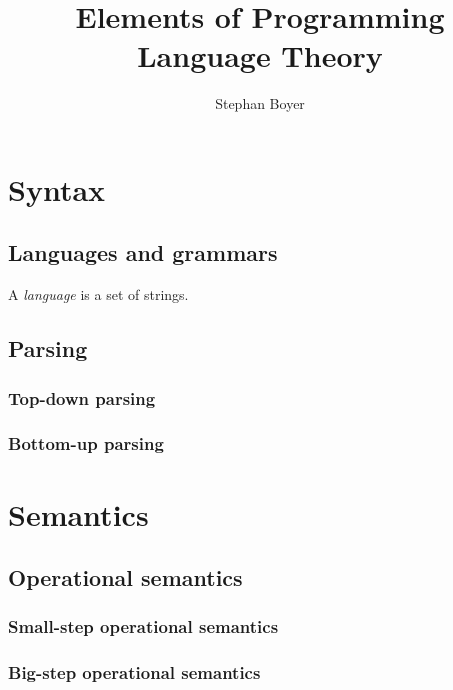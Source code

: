 \documentclass[oneside]{book}
\title{Elements of Programming Language Theory}
\author{Stephan Boyer}
\date{}
\begin{document}
  

  \frontmatter

  \maketitle

  

  \tableofcontents

  \mainmatter

  \part{Syntax}

    \chapter{Languages and grammars}

      A \emph{language} is a set of strings.

    \chapter{Parsing}

      \section{Top-down parsing}

      \section{Bottom-up parsing}

  \part{Semantics}

    \chapter{Operational semantics}

      \section{Small-step operational semantics}

      \section{Big-step operational semantics}
\end{document}
